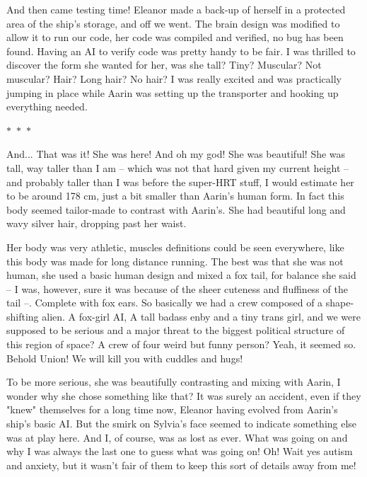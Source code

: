 \documentclass[colorlinks,12pt,a4paper]{book}
\newcommand\sep{\begin{center}
  \boldmath $\ast$~$\ast$~$\ast$
\end{center}}
\begin{document}
 And then came testing time! Eleanor made a back-up of herself in a protected area of the ship's storage, and off we went. The brain design was modified to allow it 
 to run our code, her code was compiled and verified, no bug has been found. Having an AI to verify code was pretty handy to be fair. I was thrilled to discover 
 the form she wanted for her, was she tall? Tiny? Muscular? Not muscular? Hair? Long hair? No hair? I was really excited and was practically jumping in place while 
 Aarin was setting up the transporter and hooking up everything needed.
 
 \sep 
 
 And... That was it! She was here! And oh my god! She was beautiful! She was tall, way taller than I am -- which was not that hard given my current height -- and probably 
 taller than I was before the super-HRT stuff, I would estimate her to be around 178 cm, just a bit smaller than Aarin's human form. In fact this body seemed tailor-made 
 to contrast with Aarin's. She had beautiful long and wavy silver hair, dropping past her waist. \par
 \bigskip  
 
 
 Her body was very athletic, muscles definitions could be seen everywhere,
 like this body was made for long distance running. The best was that she was not human, she used a basic human design and mixed a fox tail, for balance she said -- I was, however, 
 sure it was because of the sheer cuteness and fluffiness of the tail --. Complete with fox ears. So basically we had a crew composed of a shape-shifting alien. A 
 fox-girl AI, A tall badass enby and a tiny trans girl, and we were supposed to be serious and a major threat to the biggest political structure of this region of space? 
 A crew of four weird but funny person? Yeah, it seemed so. Behold Union! We will kill you with cuddles and hugs!\par 
 \bigskip 
 
 To be more serious, she was beautifully contrasting and mixing with Aarin, I wonder why she chose something like that? It was surely an 
 accident, even if they "knew" themselves for a long time now, Eleanor having evolved from Aarin's ship's basic AI. But the smirk on Sylvia's face 
 seemed to indicate something else was at play here. And I, of course, was as lost as ever. What was going on and why I was always the last one to 
 guess what was going on! Oh! Wait yes autism and anxiety, but it wasn't fair of them to keep this sort of details away from me!\par 
 \bigskip 
 
\end{document}
